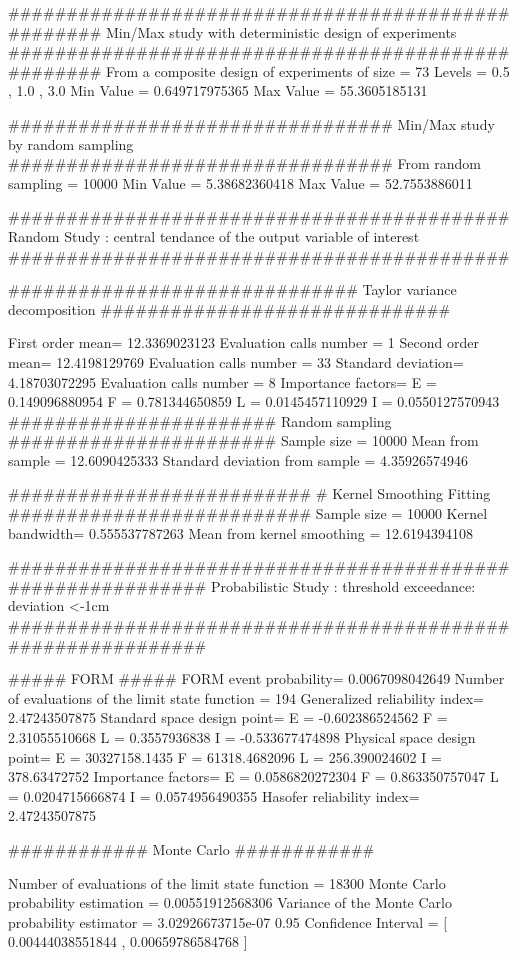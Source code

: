###################################################
 Min/Max study with deterministic design of experiments 
###################################################
From a composite  design of experiments of size =  73
Levels =  0.5 ,  1.0 ,  3.0
Min Value =  0.649717975365
Max Value =  55.3605185131

#################################
 Min/Max study by random sampling
#################################
From random sampling =  10000
Min Value =  5.38682360418
Max Value =  52.7553886011


###########################################
Random Study : central tendance of
the output variable of interest
###########################################

##############################
Taylor variance decomposition
##############################

First order mean= 12.3369023123
Evaluation calls number =  1
Second order mean= 12.4198129769
Evaluation calls number =  33
Standard deviation= 4.18703072295
Evaluation calls number =  8
Importance factors=
E  =  0.149096880954
F  =  0.781344650859
L  =  0.0145457110929
I  =  0.0550127570943
#######################
Random sampling
#######################
Sample size =  10000
Mean from sample =  12.6090425333
Standard deviation from sample =  4.35926574946

##########################
# Kernel Smoothing Fitting
##########################
Sample size =  10000
Kernel bandwidth= 0.555537787263
Mean from kernel smoothing =  12.6194394108


############################################################
Probabilistic Study : threshold exceedance: deviation <-1cm
############################################################

#####
FORM
#####
FORM event probability= 0.0067098042649
Number of evaluations of the limit state function =  194
Generalized reliability index= 2.47243507875
Standard space design point=
E  =  -0.602386524562
F  =  2.31055510668
L  =  0.3557936838
I  =  -0.533677474898
Physical space design point=
E  =  30327158.1435
F  =  61318.4682096
L  =  256.390024602
I  =  378.63472752
Importance factors=
E  =  0.0586820272304
F  =  0.863350757047
L  =  0.0204715666874
I  =  0.0574956490355
Hasofer reliability index= 2.47243507875

############
Monte Carlo
############

Number of evaluations of the limit state function =  18300
Monte Carlo probability estimation =  0.00551912568306
Variance of the Monte Carlo probability estimator =  3.02926673715e-07
0.95 Confidence Interval = [ 0.00444038551844 ,  0.00659786584768 ]

